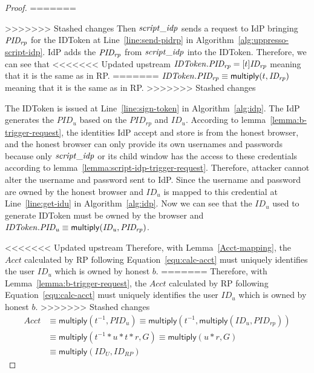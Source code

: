 \begin{theorem}
\begin{proof}
=======
    
>>>>>>> Stashed changes
    Then $\mathit{script\_idp}$ sends a request to IdP bringing $\mathit{PID_{rp}}$ for the IDToken 
    at Line~\ref{line:send-pidrp} in Algorithm~\ref{alg:uppresso-script-idp}.
    IdP adds the $\mathit{PID_{rp}}$ from $\mathit{script\_idp}$ into the IDToken.
    Therefore, we can see that 
<<<<<<< Updated upstream
    $\mathit{IDToken}.\mathit{PID_{rp}}=[t]\mathit{ID_{rp}}$ meaning that it is the same as in RP.
=======
    $\mathit{IDToken}.\mathit{PID_{rp}} \equiv \mathsf{multiply}(t, \mathit{ID_{rp}})$ meaning that it is the same as in RP.
>>>>>>> Stashed changes

    The IDToken is issued at Line~\ref{line:sign-token} in Algorithm~\ref{alg:idp}.
    The IdP generates the $PID_u$ based on the $PID_{rp}$ and $ID_u$.
    According to lemma~\ref{lemma:b-trigger-request}, 
    the identities IdP accept and store is from the honest browser, 
    and the honest browser can only provide its own usernames and passwords 
    because only $\mathit{script\_idp}$ or its child window has the access to these credentials 
    according to lemma~\ref{lemma:script-idp-trigger-request}.
    Therefore, attacker cannot alter the username and password sent to IdP.
    Since the username and password are owned by the honest browser and 
    $ID_u$ is mapped to this credential at Line~\ref{line:get-idu} in Algorithm~\ref{alg:idp}. 
    Now we can see that the $ID_u$ used to generate IDToken must be owned by the browser 
    and $\mathit{IDToken}.\mathit{PID_{u}} \equiv \mathsf{multiply}(\mathit{ID_u}, \mathit{PID_{rp}})$.
    

<<<<<<< Updated upstream
    Therefore, with Lemma~\ref{Acct-mapping}, the $Acct$ calculated by RP following Equation~\ref{equ:calc-acct} must uniquely identifies the user $ID_u$ which is owned by honest $b$.  
=======
    Therefore, with Lemma~\ref{lemma:b-trigger-request}, the $Acct$ calculated by RP following Equation~\ref{equ:calc-acct} must uniquely identifies the user $ID_u$ which is owned by honest $b$.  
>>>>>>> Stashed changes
    \begin{equation}\label{equ:calc-acct}
    \begin{split}
      Acct& \equiv \mathsf{multiply}(t^{-1}, PID_u) \equiv \mathsf{multiply}(t^{-1}, \mathsf{multiply}(ID_u, PID_{rp})) \\
      & \equiv \mathsf{multiply}(t^{-1}*u*t*r, G)  \equiv \mathsf{multiply}(u*r, G)\\
      & \equiv \mathsf{multiply}(ID_U, ID_{RP})
      \end{split}
    \end{equation}
  \end{proof}


\end{theorem}
